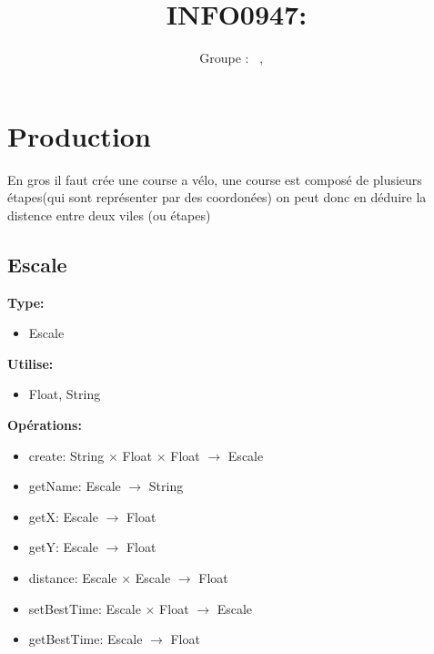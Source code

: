 \documentclass[a4paper, 11pt, oneside]{article}
\title{INFO0947: \intitule}
\author{Groupe \GrNbr : \PrenomUN~\textsc{\NomUN}, \PrenomDEUX~\textsc{\NomDEUX}}
\date{}
\begin{document}
\maketitle


\section{Production}


En gros il faut crée une course a vélo,
une course est composé de plusieurs étapes(qui sont représenter par des coordonées)
on peut donc en déduire la distence entre deux viles (ou étapes)

\subsection{Escale}

\textbf{Type:}
\begin{itemize}
    \item[] Escale
\end{itemize}

\textbf{Utilise:}
\begin{itemize}
    \item[] Float, String
\end{itemize}

\textbf{Opérations:}
\begin{itemize}
    \item[] create: String $\times$ Float $\times$ Float $\to$ Escale
    \item[] getName: Escale $\to$ String
    \item[] getX: Escale $\to$ Float
    \item[] getY: Escale $\to$ Float
    \item[] distance: Escale $\times$ Escale $\to$ Float
    \item[] setBestTime: Escale $\times$ Float $\to$ Escale
    \item[] getBestTime: Escale $\to$ Float
\end{itemize}
\end{document}
